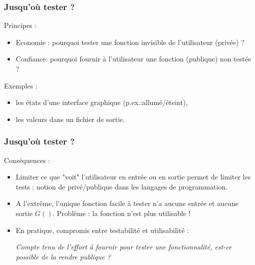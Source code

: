\documentclass{beamer}
\begin{document}

\begin{frame}[containsverbatim]
\frametitle{Jusqu'où tester ?}

Principes :
\begin{itemize}
\item Economie : pourquoi tester une fonction 
invisible de l'utilisateur (privée) ?
\item Confiance: pourquoi fournir à l'utilisateur 
une fonction (publique) non testée ?
\end{itemize}

Exemples :
\begin{itemize}
\item les états d'une interface graphique (p.ex.:allumé/éteint), 
\item les valeurs dans un fichier de sortie.
\end{itemize}
\end{frame}


\begin{frame}[containsverbatim]
\frametitle{Jusqu'où tester ?}

Conséquences :
\begin{itemize}
\item Limiter ce que "voit" l'utilisateur en entrée 
ou en sortie permet de limiter les tests : notion de privé/publique 
dans les langages de programmation.
\item A l'extrême, l'unique fonction facile à tester n'a aucune entrée 
et aucune sortie $G()$. Problème : la fonction n'est plus utilisable !
\item En pratique, compromis entre testabilité et utilisabilité :
\begin{center}
\emph{Compte tenu de l'effort à fournir pour 
tester une fonctionnalité, est-ce possible de la rendre publique ?}
\end{center}
\end{itemize}

\end{frame}

\end{document}
